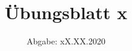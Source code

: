 

\subject{Computational Physics}
\title{Übungsblatt x}
\date{%
  Abgabe: xX.XX.2020
}



\maketitle
\thispagestyle{empty}
\newpage








